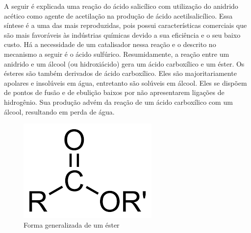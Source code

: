 A seguir é explicada uma reação do ácido salicílico com utilização do anidrido acético como agente de
acetilação na produção de ácido acetilsalicílico. Essa síntese é a uma das mais reproduzidas, pois
possui características comerciais que são mais favoráveis às indústrias químicas devido a sua
eficiência e o seu baixo custo. Há a necessidade de um catalisador nessa reação e o descrito no
mecanismo a seguir é o ácido sulfúrico. Resumidamente, a reação entre um anidrido e um álcool (ou
hidroxiácido) gera um ácido carboxílico e um éster. Os ésteres são também derivados de ácido
carboxílico. Eles são majoritariamente apolares e insolúveis em água, entretanto são solúveis em
álcool. Eles se dispõem de pontos de fusão e de ebulição baixos por não apresentarem ligações de
hidrogênio. Sua produção advém da reação de um ácido carboxílico com um álcool, resultando em perda
de água.~\cite{SantosES}

\begin{figure}[H]
\begin{center}
    \includegraphics[width=.3\textwidth]{figuras/ester.png}
\end{center}
\caption{Forma generalizada de um éster}
\label{fig:ester}
\end{figure}

